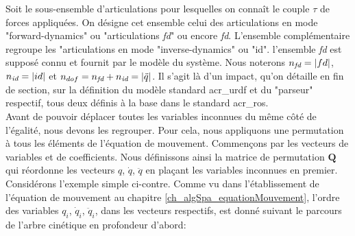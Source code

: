 \documentclass{report}
\begin{document}
Soit le sous-ensemble d'articulations pour lesquelles on connaît le couple $\tau$ de forces appliquées. On désigne cet ensemble celui des articulations en mode "forward-dynamics" ou "articulations \emph{fd}" ou encore \emph{fd}. L'ensemble complémentaire regroupe les "articulations en mode "inverse-dynamics" ou "id". l'ensemble \emph{fd} est supposé connu et fournit par le modèle du système. Nous noterons $n_{\emph{fd}}=\vert fd \vert$, $n_{\emph{id}}=\vert id \vert$ et $n_{dof}=n_{\emph{fd}}+n_{\emph{id}}=\vert \ddot{q} \vert$. Il s'agit là d'un impact, qu'on détaille en fin de section, sur la définition du modèle standard \gls{acr_urdf} et du "parseur" respectif, tous deux définis à la base dans le standard \gls{acr_ros}.\\
Avant de pouvoir déplacer toutes les variables inconnues du même côté de l'égalité, nous devons les regrouper. Pour cela, nous appliquons une permutation à tous les éléments de l'équation de mouvement. Commençons par les vecteurs de variables et de coefficients. Nous définissons ainsi la matrice de permutation $\mathbf{Q}$ qui réordonne les vecteurs $q$, $\dot{q}$, $\ddot{q}$ en plaçant les variables inconnues en premier. Considérons l'exemple simple ci-contre. Comme vu dans l'établissement de l'équation de mouvement au chapitre \ref{ch_algSpa_equationMouvement}, l'ordre des variables $q_i$, $\dot{q}_i$, $\ddot{q}_i$, dans les vecteurs respectifs, est donné suivant le parcours de l'arbre cinétique en profondeur d'abord:
\end{document}
